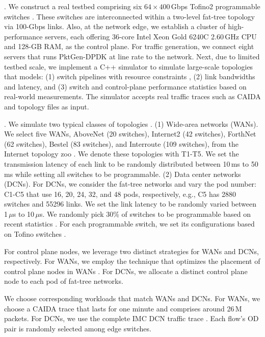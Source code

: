 . We construct a real testbed comprising six \(64 \times 400\)\,Gbps Tofino2 programmable switches \cite{tofino2}. These switches are interconnected within a two-level fat-tree topology via 100-Gbps links. Also, at the network edge, we establish a cluster of high-performance servers, each offering 36-core Intel Xeon Gold 6240C 2.60\,GHz CPU and 128-GB RAM, as the control plane. For traffic generation, we connect eight servers that runs PktGen-DPDK \cite{pktgen} at line rate to the network. Next, due to limited testbed scale, we implement a C++ simulator to simulate large-scale topologies that models: (1) switch pipelines with resource constraints \cite{jose2015compiling}, (2) link bandwidths and latency, and (3) switch and control-plane performance statistics based on real-world measurements. The simulator accepts real traffic traces such as CAIDA \cite{caida} and topology files as input.

. We simulate two typical classes of topologies \cite{anup2022hetero,chen2024eagle}. (1) Wide-area networks (WANs). We select five WANs, AboveNet (20 switches), Internet2 (42 switches), ForthNet (62 switches), Bestel (83 switches), and Interroute (109 switches), from the Internet topology zoo \cite{knight2011internet}. We denote these topologies with T1-T5. We set the transmission latency of each link to be randomly distributed between 10\,ms to 50\,ms while setting all switches to be programmable. (2) Data center networks (DCNs). For DCNs, we consider the fat-tree networks and vary the pod number: C1-C5 that use 16, 20, 24, 32, and 48 pods, respectively, e.g., C5 has 2880 switches and 55296 links. We set the link latency to be randomly varied between 1\,$\mu$s to 10\,$\mu$s. We randomly pick 30\% of switches to be programmable based on recent statistics \cite{telecom}. For each programmable switch, we set its configurations based on Tofino switches \cite{jose2015compiling}.

For control plane nodes, we leverage two distinct strategies for WANs and DCNs, respectively. For WANs, we employ the technique that optimizes the placement of control plane nodes in WANs \cite{heller2012controller}. For DCNs, we allocate a distinct control plane node to each pod of fat-tree networks. 

We choose corresponding workloads that match WANs and DCNs. For WANs, we choose a CAIDA trace \cite{caida} that lasts for one minute and comprises around 26\,M packets. For DCNs, we use the complete IMC DCN traffic trace \cite{benson2010network}. Each flow's OD pair is randomly selected among edge switches. 


